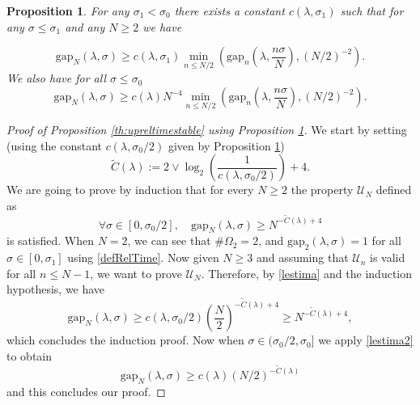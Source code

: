 \documentclass[reqno,11pt]{amsart}
\numberwithin{equation}{section}
\newcommand{\gl}{\lambda}
\newcommand{\gs}{\sigma}
\newcommand{\cU}{{\ensuremath{\mathcal U}} }
\newtheorem{proposition}[theorem]{Proposition}
\newcommand{\Gap}{\mathrm{gap}}
\renewcommand{\tilde}{\widetilde}
\begin{document}
\begin{proposition}\label{th:maininductionstep}
For any $\sigma_1<\sigma_0$ there exists a constant $c(\gl,\sigma_1)$ such that for any $\sigma\le \sigma_1$ and any $N\ge 2$  we have 

\begin{equation}\label{lestima}
\Gap_{N}(\gl, \sigma)\ge c (\gl,\sigma_1) \min_{n\le N/2}  \left( \Gap_{n}\left(\gl, \frac{n\sigma}{N}\right), (N/2)^{-2}\right).
\end{equation}
We also have for all $\sigma\le \sigma_0$
\begin{equation}\label{lestima2}
\Gap_{N}(\gl, \sigma)\ge c(\gl) N^{-4} \min_{n\le N/2}  \left( \Gap_{n}\left(\gl,\frac{n\sigma}{N}\right), (N/2)^{-2}\right).
\end{equation}


 
\end{proposition}


\begin{proof}[Proof of Proposition \ref{th:upreltimestable} using Proposition \ref{th:maininductionstep}]

We start by setting (using the constant $c(\gl, \gs_0/2)$ given by Proposition \ref{th:maininductionstep})
 \begin{equation}\label{leconstanz}
 \tilde C(\gl):= 2 \vee \log_2\left( \frac 1 {c(\gl, \gs_0/2)}\right)+4.
 \end{equation}
We are going to prove by induction that for every $N\ge 2$ the property $\cU_N$  defined as 
\begin{equation}
\forall \gs \in [0, \gs_0/2], \quad \Gap_N(\gl, \gs) \ge N^{-\tilde C(\gl)+4}
\end{equation}
is satisfied.
When $N=2$, we can see that $\# \Omega_2=2$, and  $\Gap_2(\lambda, \sigma)=1$ for all $\sigma \in [0, \gs_1]$ using \eqref{defRelTime}.
Now given $N\ge 3$ and assuming that $\cU_n$  is valid for all $n\le N-1$, we want  
to prove  $\cU_N$.
     Therefore, by  \eqref{lestima} and the induction hypothesis,  we have
\begin{equation}\label{gapinduct}
\Gap_N(\gl, \gs) \ge c(\gl, \gs_0/2)\left(\frac{N}{2}\right)^{-\tilde C(\gl)+4} \ge N^{-\tilde C(\gl)+4},
\end{equation}
which concludes the induction proof.
 Now when $\sigma\in (\sigma_0/2,\sigma_0]$ we  apply \eqref{lestima2} to obtain 
 \begin{equation}\label{afterinduct}
  \Gap_N(\gl, \gs)\ge c (\gl) (N/2)^{-\tilde C(\gl)}
 \end{equation}
and this concludes our proof.





\end{proof}
\end{document}
